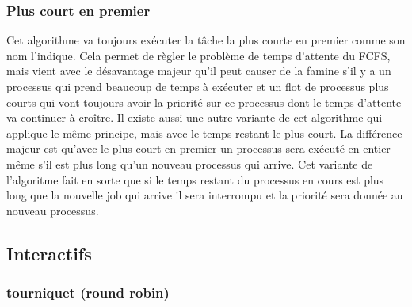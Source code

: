 \documentclass{article}
\begin{document}
\subsubsection{Plus court en premier}

Cet algorithme va toujours exécuter la tâche la plus courte en premier comme son nom l'indique. Cela permet de règler le problème de temps d'attente du FCFS, mais vient avec le désavantage majeur qu'il peut causer de la famine s'il y a un processus qui prend beaucoup de temps à exécuter et un flot de processus plus courts qui vont toujours avoir la priorité sur ce processus dont le temps d'attente va continuer à croître.
\newline
\newline
Il existe aussi une autre variante de cet algorithme qui applique le même principe, mais avec le temps restant le plus court. La différence majeur est qu'avec le plus court en premier un processus sera exécuté en entier même s'il est plus long qu'un nouveau processus qui arrive. Cet variante de l'algoritme fait en sorte que si le temps restant du processus en cours est plus long que la nouvelle job qui arrive il sera interrompu et la priorité sera donnée au nouveau processus.
\subsection{Interactifs}

\subsubsection{tourniquet (round robin)} 
\end{document}
